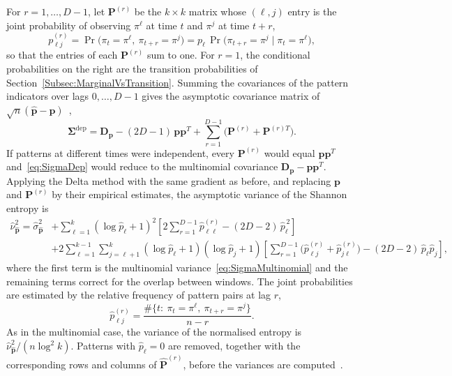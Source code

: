 For $r=1,\dots,D-1$, let $\mathbf{P}^{(r)}$ be the $k\times k$ matrix whose $(\ell,j)$ entry is the joint probability of observing $\pi^\ell$ at time $t$ and $\pi^j$ at time $t+r$,
\[
p^{(r)}_{\ell j}=\Pr\big(\pi_t=\pi^\ell,\ \pi_{t+r}=\pi^j\big)
= p_\ell\,\Pr\big(\pi_{t+r}=\pi^j \mid \pi_t=\pi^\ell\big),
\]
so that the entries of each $\mathbf{P}^{(r)}$ sum to one. For $r=1$, the conditional probabilities on the right are the transition probabilities of Section~\ref{Subsec:MarginalVsTransition}. Summing the covariances of the pattern indicators over lags $0,\dots,D-1$ gives the asymptotic covariance matrix of $\sqrt{n}(\widehat{\mathbf{p}}-\mathbf{p})$~\cite{Rey2023a,Rey2024},
\begin{equation}
	\boldsymbol{\Sigma}^{\mathrm{dep}} = \mathbf{D_p} - (2D-1)\,\mathbf{p}\mathbf{p}^{T} + \sum_{r=1}^{D-1}\big(\mathbf{P}^{(r)}+\mathbf{P}^{(r)T}\big).
	\label{eq:SigmaDep}
\end{equation}
If patterns at different times were independent, every $\mathbf{P}^{(r)}$ would equal $\mathbf{p}\mathbf{p}^{T}$ and~\eqref{eq:SigmaDep} would reduce to the multinomial covariance $\mathbf{D_p}-\mathbf{p}\mathbf{p}^{T}$. Applying the Delta method with the same gradient as before, and replacing $\mathbf{p}$ and $\mathbf{P}^{(r)}$ by their empirical estimates, the asymptotic variance of the Shannon entropy is
\begin{equation}
	\begin{split}
		\widehat{\nu}^2_{\widehat{\mathbf{p}}} = \widehat{\sigma}^2_{\widehat{\mathbf{p}}}
		& + \sum_{\ell=1}^{k}(\log \widehat{p}_\ell + 1)^2
		\left[ 2\sum_{r=1}^{D-1} \widehat{p}^{(r)}_{\ell\ell} - (2D-2)\,\widehat{p}_\ell^{\,2} \right] \\
		& + 2 \sum_{\ell=1}^{k-1} \sum_{j=\ell+1}^{k} (\log \widehat{p}_\ell + 1)(\log \widehat{p}_j + 1)
		\left[ \sum_{r=1}^{D-1} \big( \widehat{p}^{(r)}_{\ell j} + \widehat{p}^{(r)}_{j\ell} \big) - (2D-2)\,\widehat{p}_\ell \widehat{p}_j \right],
	\end{split}
	\label{eq:asympvar}
\end{equation}
where the first term is the multinomial variance~\eqref{eq:SigmaMultinomial} and the remaining terms correct for the overlap between windows. The joint probabilities are estimated by the relative frequency of pattern pairs at lag $r$,
\[
\widehat{p}^{(r)}_{\ell j}=\frac{\#\{t:\ \pi_t=\pi^\ell,\ \pi_{t+r}=\pi^j\}}{n-r}.
\]
As in the multinomial case, the variance of the normalised entropy is $\widehat{\nu}^2_{\widehat{\mathbf{p}}}/(n\log^2 k)$. Patterns with $\widehat{p}_\ell=0$ are removed, together with the corresponding rows and columns of $\widehat{\mathbf{P}}^{(r)}$, before the variances are computed~\cite{Rey2024}.

